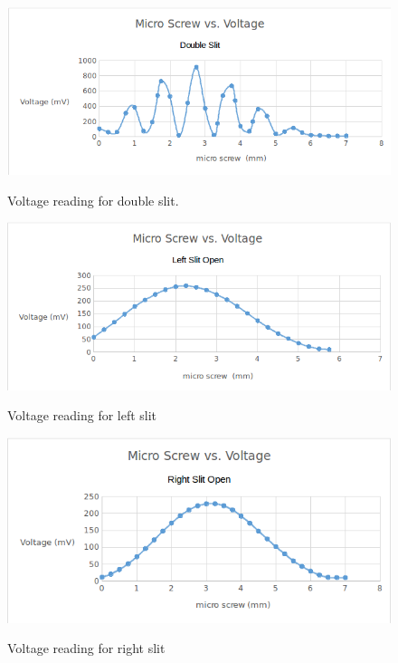 \documentclass[12pt letterpaper]{article}
\begin{document}
\begin{figure}[!ht]
  \caption{Voltage reading for double slit.}
  \centering
    \includegraphics[width=\textwidth]{voltage_double_slit.png}
    \label{fig:voltage double slit}
\end{figure}

\begin{figure}[!ht]
  \caption{Voltage reading for left slit}
  \centering
    \includegraphics[width=\textwidth]{voltage_left_slit.png}
    \label{fig:voltage left slit}
\end{figure}


\begin{figure}[!ht]
  \caption{Voltage reading for right slit}
  \centering
    \includegraphics[width=\textwidth]{voltage_right_slit.png}
    \label{fig:voltage right slit}
\end{figure}
\end{document}
